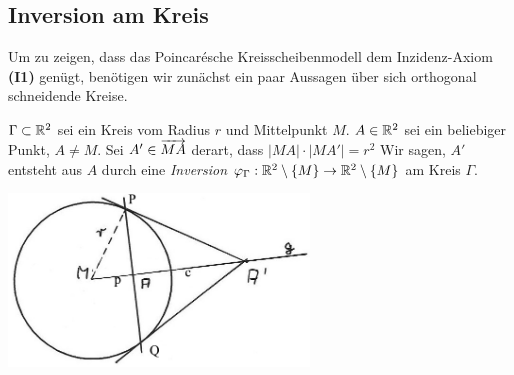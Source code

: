 \subsection*{Inversion am Kreis}

Um zu zeigen, dass das Poincarésche Kreisscheibenmodell dem Inzidenz-Axiom {\bf (I1)} genügt,
benötigen wir zunächst ein paar Aussagen über sich orthogonal schneidende Kreise.


\begin{defi}
    $\Gamma \subset \mathbb R^2$ sei ein Kreis vom Radius $r$ und Mittelpunkt $M$. $A \in \mathbb R^2$ sei ein
    beliebiger Punkt, $A \neq M$. Sei $A' \in \mbox{${\overrightarrow{MA}}$}$ derart, dass $|MA| \cdot |MA'| = r^2$
    Wir sagen, $A'$ entsteht aus $A$ durch eine \emph{Inversion} $\varphi_\Gamma :
    \mathbb R^2 \setminus\{M\} \to \mathbb R^2 \setminus \{M\}$ am Kreis $\Gamma$.
\end{defi}

\centerline{\includegraphics[width=8cm]{BILDER/4-2-01-Inversion.jpg}}

